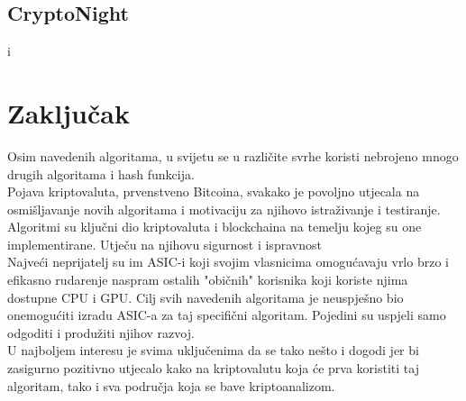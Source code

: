 \documentclass[12pt]{article}
\providecommand\phantomsection{}
\begin{document}
\subsection{CryptoNight}
\cite{cryptonighgt} i \cite{monero}

\pagebreak
\section{Zaključak}
Osim navedenih algoritama, u svijetu se u različite svrhe koristi nebrojeno mnogo drugih algoritama i hash funkcija.\\
Pojava kriptovaluta, prvenstveno Bitcoina, svakako je povoljno utjecala na osmišljavanje novih algoritama i motivaciju za njihovo istraživanje i testiranje. \\
Algoritmi su ključni dio kriptovaluta i blockchaina na temelju kojeg su one implementirane. Utječu na njihovu sigurnost i ispravnost\\
Najveći neprijatelj su im ASIC-i koji svojim vlasnicima omogućavaju vrlo brzo i efikasno rudarenje naspram ostalih "običnih" korisnika koji koriste njima dostupne CPU i GPU. Cilj svih navedenih algoritama je neuspješno bio onemogućiti izradu ASIC-a za taj specifični algoritam. Pojedini su uspjeli samo odgoditi i produžiti njihov razvoj.\\
U najboljem interesu je svima uključenima da se tako nešto i dogodi jer bi zasigurno pozitivno utjecalo kako na kriptovalutu koja će prva koristiti taj algoritam, tako i sva područja koja se bave kriptoanalizom.

\phantomsection
{}

\pagebreak


\phantomsection
{}




	
\end{document}
